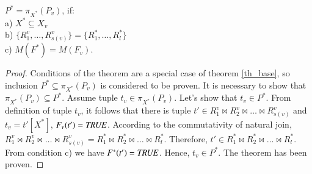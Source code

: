 \begin{theorem}
$P^{\ast} = \pi_{X^{\ast}} (P_{v})$, if:
\\a) $X^{\ast} \subseteq X_{v}$
\\b) $\{R^{v}_{1}, \ldots, R^{v}_{s(v)}\} = \{R^{\ast}_{1}, \ldots,
R^{\ast}_{l}\}$
\\c) $M (F^{\ast}) = M (F_{v}) $.
\label{th_base_eq}
\end{theorem}
\begin{proof}
Conditions of the theorem are a special case of theorem \ref{th_base}, so
inclusion $P^{\ast} \subseteq \pi_{X^{\ast}} (P_{v})$ is considered  to be
proven. It is necessary to show that $\pi_{X^{\ast}} (P_{v}) \subseteq
P^{\ast}$. Assume tuple $t_v \in \pi_{X^{\ast}} (P_{v})$. Let's show that $t_v
\in P^{\ast}$. From definition of tuple $t_v$, it follows that there is tuple
$t' \in R^v_1 \Join R^v_2\Join\ldots \Join R^v_{s(v)}$ and $t_v = t'[X^{\ast}]$,
$F_v(t')=\mathit{TRUE}$. According to the commutativity of natural join, $R^v_1 \Join
R^v_2\Join\ldots \Join R^v_{s(v)} = R^{\ast}_1 \Join R^{\ast}_2\Join\ldots \Join
R^{\ast}_l$. Therefore, $t' \in R^{\ast}_1 \Join R^{\ast}_2\Join\ldots \Join
R^{\ast}_l$. From condition c) we have $F^{\ast} (t')=\mathit{TRUE}$. Hence, $t_v \in
P^{\ast}$. The theorem has been proven.
\end{proof}
